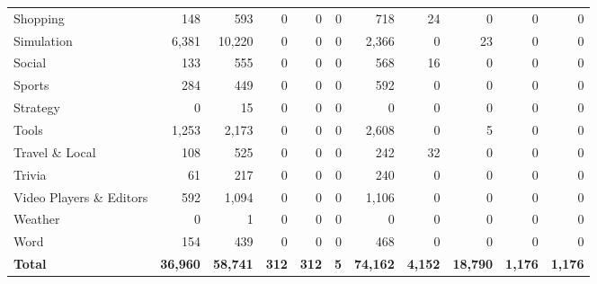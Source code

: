 \documentclass[
A4paper,                %
twoside,                %
openright,              %
chapterprefix=true,     %
12pt,                   %
headings=normal,        %
titlepage=on            %
]{book}
\begin{document}
\begin{table}[p]
\begin{tabular}{lrrrrrrrrrr}
        Shopping & 148 & 593 & 0 & 0 & 0 & 718 & 24 & 0 & 0 & 0 \\
        Simulation & 6,381 & 10,220 & 0 & 0 & 0 & 2,366 & 0 & 23 & 0 & 0 \\
        Social & 133 & 555 & 0 & 0 & 0 & 568 & 16 & 0 & 0 & 0 \\
        Sports & 284 & 449 & 0 & 0 & 0 & 592 & 0 & 0 & 0 & 0 \\
        Strategy & 0 & 15 & 0 & 0 & 0 & 0 & 0 & 0 & 0 & 0 \\
        Tools & 1,253 & 2,173 & 0 & 0 & 0 & 2,608 & 0 & 5 & 0 & 0 \\
        Travel \& Local & 108 & 525 & 0 & 0 & 0 & 242 & 32 & 0 & 0 & 0 \\
        Trivia & 61 & 217 & 0 & 0 & 0 & 240 & 0 & 0 & 0 & 0 \\
        Video Players \& Editors & 592 & 1,094 & 0 & 0 & 0 & 1,106 & 0 & 0 & 0 & 0 \\
        Weather & 0 & 1 & 0 & 0 & 0 & 0 & 0 & 0 & 0 & 0 \\
        Word & 154 & 439 & 0 & 0 & 0 & 468 & 0 & 0 & 0 & 0 \\
        \midrule
        \textbf{Total} & \textbf{36,960} & \textbf{58,741} & \textbf{312} & \textbf{312} & \textbf{5} & \textbf{74,162} & \textbf{4,152} & \textbf{18,790} & \textbf{1,176} & \textbf{1,176} \\
        \bottomrule
    \end{tabular}
\end{table}
 \newpage 

%

\cleardoublepage

\backmatter
\printbibliography[title=References, heading=bibintoc]

\appendix

\end{document}
